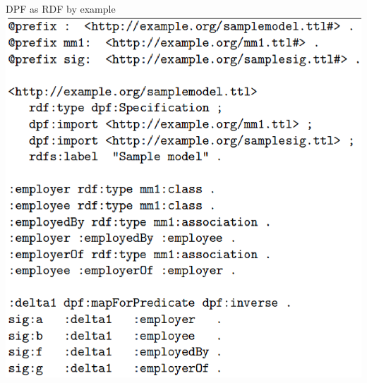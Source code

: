 \documentclass[dvips,slidetop,mathserif,red]{beamer}
\begin{document}
\begin{frame}[t]{DPF as RDF by example}
{      \includegraphics[scale=0.4]{inst}
  }
\end{frame}
\end{document}
